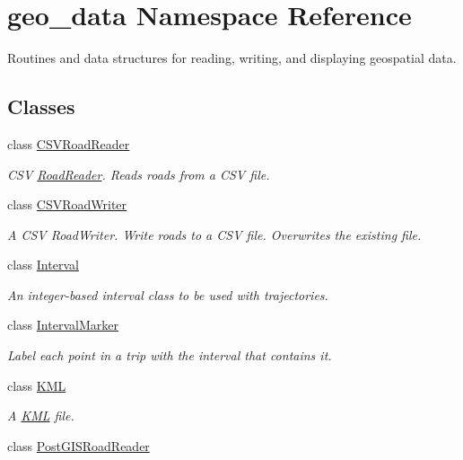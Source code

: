 \hypertarget{namespacegeo__data}{}\section{geo\+\_\+data Namespace Reference}
\label{namespacegeo__data}


Routines and data structures for reading, writing, and displaying geospatial data.  


\subsection*{Classes}
\begin{DoxyCompactItemize}
\item 
class \hyperlink{classgeo__data_1_1CSVRoadReader}{C\+S\+V\+Road\+Reader}
\begin{DoxyCompactList}\small\item\em C\+SV \hyperlink{classgeo__data_1_1RoadReader}{Road\+Reader}. Reads roads from a C\+SV file. \end{DoxyCompactList}\item 
class \hyperlink{classgeo__data_1_1CSVRoadWriter}{C\+S\+V\+Road\+Writer}
\begin{DoxyCompactList}\small\item\em A C\+SV Road\+Writer. Write roads to a C\+SV file. Overwrites the existing file. \end{DoxyCompactList}\item 
class \hyperlink{classgeo__data_1_1Interval}{Interval}
\begin{DoxyCompactList}\small\item\em An integer-\/based interval class to be used with trajectories. \end{DoxyCompactList}\item 
class \hyperlink{classgeo__data_1_1IntervalMarker}{Interval\+Marker}
\begin{DoxyCompactList}\small\item\em Label each point in a trip with the interval that contains it. \end{DoxyCompactList}\item 
class \hyperlink{classgeo__data_1_1KML}{K\+ML}
\begin{DoxyCompactList}\small\item\em A \hyperlink{classgeo__data_1_1KML}{K\+ML} file. \end{DoxyCompactList}\item 
class \hyperlink{classgeo__data_1_1PostGISRoadReader}{Post\+G\+I\+S\+Road\+Reader}

\end{DoxyCompactItemize}
